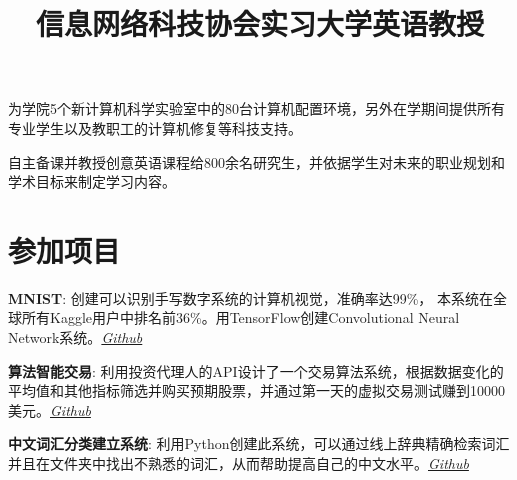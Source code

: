 \documentclass[margin]{res}
\begin{document}
\begin{resume}
\title{\textbf{信息网络科技协会实习}}
\begin{position}
为学院5个新计算机科学实验室中的80台计算机配置环境，另外在学期间提供所有专业学生以及教职工的计算机修复等科技支持。
\end{position}

\title{\textbf{大学英语教授}}
\begin{position}
自主备课并教授创意英语课程给800余名研究生，并依据学生对未来的职业规划和学术目标来制定学习内容。
\end{position}

\section{参加项目}
\par
\textbf{MNIST}:
创建可以识别手写数字系统的计算机视觉，准确率达99\%， 本系统在全球所有Kaggle用户中排名前36\%。用TensorFlow创建Convolutional Neural Network系统。\textit{\href{https://github.com/lucaskjaero/MNIST}{Github}}

\par
\textbf{算法智能交易}:
利用投资代理人的API设计了一个交易算法系统，根据数据变化的平均值和其他指标筛选并购买预期股票，并通过第一天的虚拟交易测试赚到10000美元。\textit{\href{https://github.com/lucaskjaero/Algorithmic-Trading-API}{Github}}


\par
\textbf{中文词汇分类建立系统}:
利用Python创建此系统，可以通过线上辞典精确检索词汇并且在文件夹中找出不熟悉的词汇，从而帮助提高自己的中文水平。\textit{\href{https://github.com/lucaskjaero/Chinese-Vocabulary-Finder}{Github}}



\end{resume}
\end{document}
